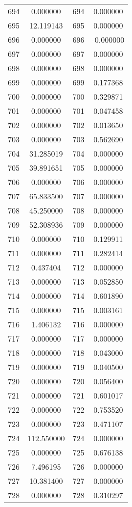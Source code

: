\documentclass[12pt]{article}
\begin{document}
\begin{longtable}{@{}cccc@{}}
694 & 0.000000 & 694 & 0.000000 \\
695 & 12.119143 & 695 & 0.000000 \\
696 & 0.000000 & 696 & -0.000000 \\
697 & 0.000000 & 697 & 0.000000 \\
698 & 0.000000 & 698 & 0.000000 \\
699 & 0.000000 & 699 & 0.177368 \\
700 & 0.000000 & 700 & 0.329871 \\
701 & 0.000000 & 701 & 0.047458 \\
702 & 0.000000 & 702 & 0.013650 \\
703 & 0.000000 & 703 & 0.562690 \\
704 & 31.285019 & 704 & 0.000000 \\
705 & 39.891651 & 705 & 0.000000 \\
706 & 0.000000 & 706 & 0.000000 \\
707 & 65.833500 & 707 & 0.000000 \\
708 & 45.250000 & 708 & 0.000000 \\
709 & 52.308936 & 709 & 0.000000 \\
710 & 0.000000 & 710 & 0.129911 \\
711 & 0.000000 & 711 & 0.282414 \\
712 & 0.437404 & 712 & 0.000000 \\
713 & 0.000000 & 713 & 0.052850 \\
714 & 0.000000 & 714 & 0.601890 \\
715 & 0.000000 & 715 & 0.003161 \\
716 & 1.406132 & 716 & 0.000000 \\
717 & 0.000000 & 717 & 0.000000 \\
718 & 0.000000 & 718 & 0.043000 \\
719 & 0.000000 & 719 & 0.040500 \\
720 & 0.000000 & 720 & 0.056400 \\
721 & 0.000000 & 721 & 0.601017 \\
722 & 0.000000 & 722 & 0.753520 \\
723 & 0.000000 & 723 & 0.471107 \\
724 & 112.550000 & 724 & 0.000000 \\
725 & 0.000000 & 725 & 0.676138 \\
726 & 7.496195 & 726 & 0.000000 \\
727 & 10.381400 & 727 & 0.000000 \\
728 & 0.000000 & 728 & 0.310297 \\

\end{longtable}
\end{document}

